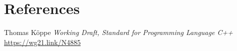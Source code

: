 \documentclass{wg21}
\begin{document}
\section{References}
\renewcommand{\section}[2]{}%



\begin{thebibliography}{9}

Thomas Köppe
\emph{Working Draft, Standard for Programming Language C++}\newline
\url{https://wg21.link/N4885}


\end{thebibliography}
\end{document}
